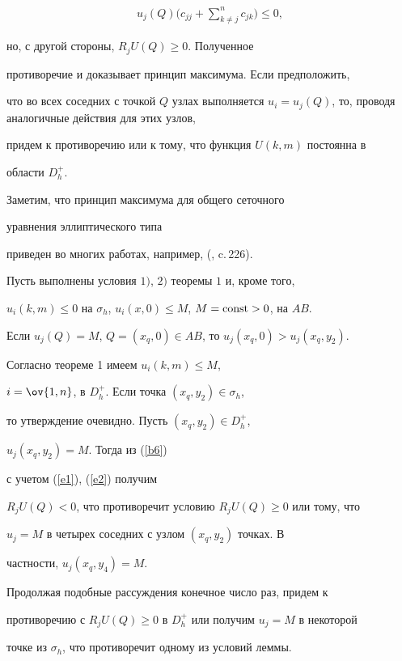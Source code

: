 \begin{pf}
\begin{gather*}
u_j(Q) \bigg(c_{jj} + \sum\limits_{k\ne j}^n c_{jk} \bigg)\leq 0,


\end{gather*}


но, с другой стороны, $R_jU(Q) \geq 0$. Полученное


противоречие и доказывает принцип максимума. Если предположить, 


что во всех соседних с точкой $Q$ узлах выполняется $u_i =


u_j(Q)$, то, проводя аналогичные действия для этих узлов,


придем к противоречию или к тому, что функция $U(k,m)$ постоянна в


области $D_h^+$.


\end{pf}





Заметим, что принцип максимума для общего сеточного


уравнения эллиптического типа


приведен во многих работах, например, (\cite{Samarski}, c.\,226).








\begin{lem}


Пусть выполнены условия $1)$, $2)$ теоремы $1$ и, кроме того,


$u_i(k,m) \leq 0$ на $\sigma_h$, $u_i(x,0)\leq M$, $M=\operatorname{const}>0$, на $AB$. 


Если $u_j(Q)=M$, $Q=(x_q,0)\in AB$, то $u_j(x_q,0)>u_j(x_q, y_2)$.


\end{lem}








\begin{pf}


Согласно теореме 1 имеем $u_i(k,m)\leq M$,


$i=\ov{1,n}$, в $D_h^+$. Если точка $(x_q, y_2)\in \sigma_h$,


то утверждение очевидно. Пусть $(x_q, y_2)\in D_h^+$, 


$u_j(x_q, y_2) = M$. Тогда из (\ref{b6})


с учетом (\ref{e1}), (\ref{e2}) получим


$R_jU(Q) < 0$, что противоречит условию $R_jU(Q) \ge 0$ или тому, что


$u_j=M$ в четырех соседних с узлом $(x_q,y_2)$ точках. В


частности, $u_j(x_q,y_4)=M$.


Продолжая подобные рассуждения конечное число раз, придем к


противоречию с $R_jU(Q) \geq 0$ в $D_h^+$ или получим $u_j = M$ в некоторой


точке из $\sigma_h$, что противоречит одному из условий леммы.


\end{pf}








